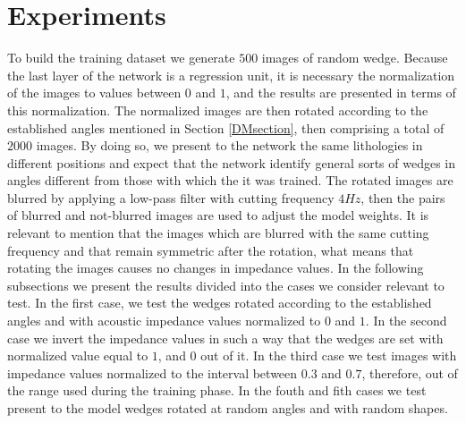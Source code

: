 \documentclass[conference]{IEEEtran}
\begin{document}
\section{Experiments}
To build the training dataset we generate $500$ images of random wedge.
Because the last layer of the network is a regression unit, it is necessary the
normalization of the images to values between $0$ and $1$, and the results
are presented in terms of this normalization.
The normalized images are then rotated according to the established angles mentioned in Section \ref{DMsection},
then comprising a total of $2000$ images. By doing so, we present to
the network the same lithologies in different positions and expect that the network
identify general sorts of wedges in angles different from those with which the it was trained.
The rotated images are blurred by applying a low-pass filter with
cutting frequency $4Hz$, then the pairs of blurred and not-blurred images are used to
adjust the model weights. It is relevant to mention that the images which are blurred with
the same cutting frequency and that remain symmetric after the rotation, what means that rotating the images causes no changes in impedance values.
In the following subsections we present the results divided into the cases we consider relevant to test. In the
first case, we test the wedges rotated according to the established angles and with acoustic impedance values normalized to $0$ and $1$.
In the second case we invert the impedance values in such a way that the wedges are set with normalized value equal to $1$, and $0$ out of it.
In the third case we test images with impedance values normalized to the interval between $0.3$ and $0.7$, therefore, out of the range used during the training phase.
In the fouth and fith cases we test present to the model wedges rotated at random angles and with random shapes.
\end{document}
